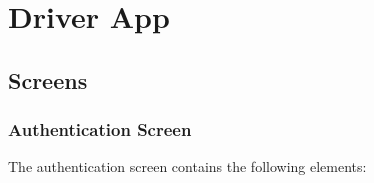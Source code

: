 \documentclass[letterpaper,10pt,english]{sphinxmanual}
\begin{document}
\section{Driver App}
\label{\detokenize{microservices/driver_app/index:driver-app}}\label{\detokenize{microservices/driver_app/index::doc}}

\subsection{Screens}
\label{\detokenize{microservices/driver_app/screens:screens}}\label{\detokenize{microservices/driver_app/screens::doc}}

\subsubsection{Authentication Screen}
\label{\detokenize{microservices/driver_app/screens:authentication-screen}}
The authentication screen contains the following elements:
\end{document}
